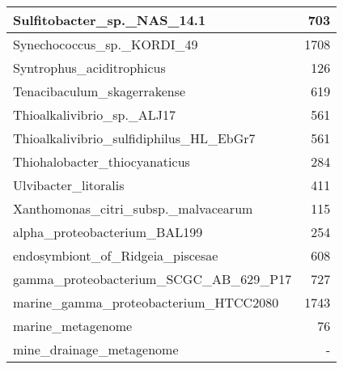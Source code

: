 \documentclass[12pt,a4paper]{article}
\begin{document}
\begin{table}[ht]
\begin{center}
\begin{tabular}{|l*{1}{|r}|}
Sulfitobacter\_sp.\_NAS\_14.1 & 703 \\ \hline
Synechococcus\_sp.\_KORDI\_49 & 1708 \\ \hline
Syntrophus\_aciditrophicus & 126 \\ \hline
Tenacibaculum\_skagerrakense & 619 \\ \hline
Thioalkalivibrio\_sp.\_ALJ17 & 561 \\ \hline
Thioalkalivibrio\_sulfidiphilus\_HL\_EbGr7 & 561 \\ \hline
Thiohalobacter\_thiocyanaticus & 284 \\ \hline
Ulvibacter\_litoralis & 411 \\ \hline
Xanthomonas\_citri\_subsp.\_malvacearum & 115 \\ \hline
alpha\_proteobacterium\_BAL199 & 254 \\ \hline
endosymbiont\_of\_Ridgeia\_piscesae & 608 \\ \hline
gamma\_proteobacterium\_SCGC\_AB\_629\_P17 & 727 \\ \hline
marine\_gamma\_proteobacterium\_HTCC2080 & 1743 \\ \hline
marine\_metagenome & 76 \\ \hline
mine\_drainage\_metagenome & - \\ \hline
\end{tabular}
\end{center}
\end{table}
\end{document}
